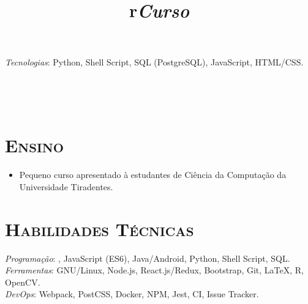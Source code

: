 \begin{resume}
\begin{position}
\begin{itemize}
\vspace{1mm}
{\small \emph{Tecnologias}: Python, Shell Script, SQL (PostgreSQL), JavaScript,
HTML/CSS\@.}
\end{itemize}
\end{position}


\begin{formatb}
  \\
  \title{r}\\
\end{formatb}

\section{\textsc{Ensino}}

\title{\emph{Curso}}
\begin{position}
\vspace{1mm}
\begin{itemize}\small
\item Pequeno curso apresentado \`a estudantes de Ci\^encia da Computa\c{c}\~ao
da Universidade Tiradentes.
\end{itemize}
\end{position}


\section{\textsc{Habilidades T\'ecnicas}}

\emph{Programa\c{c}\~ao}: \Cplusplus, JavaScript (ES6), Java/Android, Python, Shell
Script, SQL.\vspace{0.4em}\\
\emph{Ferramentas}: GNU/Linux, Node.js, React.js/Redux, Bootstrap, Git,
\LaTeX, R, OpenCV.\vspace{0.4em}\\
\emph{DevOps}: Webpack, PostCSS, Docker, NPM, Jest, CI, Issue Tracker.

\end{resume}

